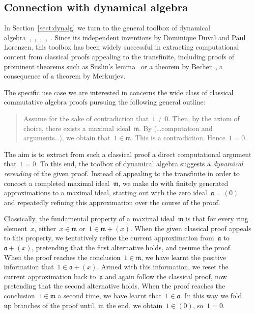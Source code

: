 \documentclass[com,11pt,crcready]{iosart2x}
\theoremstyle{definition}
\theoremstyle{plain}
\theoremstyle{remark}
\newcommand{\aaa}{\mathfrak{a}}
\newcommand{\mmm}{\mathfrak{m}}
\renewcommand{\_}{\mathpunct{.}\,}
\begin{document}
\subsection*{Connection with dynamical algebra}

In Section~\ref{sect:dynalg} we turn to the general toolbox of dynamical
algebra~\cite[Section~XV.6]{lombardi-quitte:constructive-algebra},~\cite{coquand-lombardi-roy:dynamicalmethod},~\cite{yengui:constructive},~\cite{duval:about},~\cite{neuwirth:lorenzen}. Since its
independent inventions by Dominique Duval and Paul
Lorenzen, this toolbox has been widely
successful in extracting computational content from classical proofs
appealing to the transfinite, including proofs of prominent theorems such as
Suslin's lemma~\cite{suslin:structure,yengui:maximal} or a theorem by
Becher~\cite{becher:csa}, a consequence of a theorem by Merkurjev.

The specific use case we are interested in concerns the wide class of classical
commutative algebra proofs pursuing the following general outline:
\begin{quote}\small Assume for the sake of contradiction that~$1 \neq 0$. Then, by the
axiom of choice, there exists a maximal ideal~$\mmm$. By (\ldots computation
and arguments\ldots\!), we obtain that~$1 \in \mmm$. This is a contradiction.
Hence~$1 = 0$.\end{quote}

The aim is to extract from such a classical proof a direct computational argument that~$1 = 0$.
To this end, the toolbox of dynamical algebra suggests a
\emph{dynamical rereading} of the given proof. Instead of appealing to the
transfinite in order to concoct a completed maximal ideal~$\mmm$, we make do
with finitely generated approximations to a maximal ideal, starting out with
the zero ideal~$\aaa = (0)$ and repeatedly refining this approximation over the
course of the proof.

Classically, the fundamental property of a maximal ideal~$\mmm$ is that for every ring
element~$x$, either~$x \in \mmm$ or~$1 \in \mmm + (x)$. When the given classical
proof appeals to this property, we tentatively refine the current
approximation from~$\aaa$ to~$\aaa + (x)$, pretending that the first alternative
holds, and resume the proof. When the proof reaches the conclusion~$1 \in
\mmm$, we have learnt the positive information that~$1 \in \aaa + (x)$.
Armed with this information, we reset the current approximation back to~$\aaa$
and again follow the classical proof, now pretending that the second
alternative holds. When the proof reaches the conclusion~$1 \in \mmm$ a second
time, we have learnt that~$1 \in \aaa$. In this way we fold up branches of the
proof until, in the end, we obtain~$1 \in (0)$, so~$1 = 0$.
\end{document}
